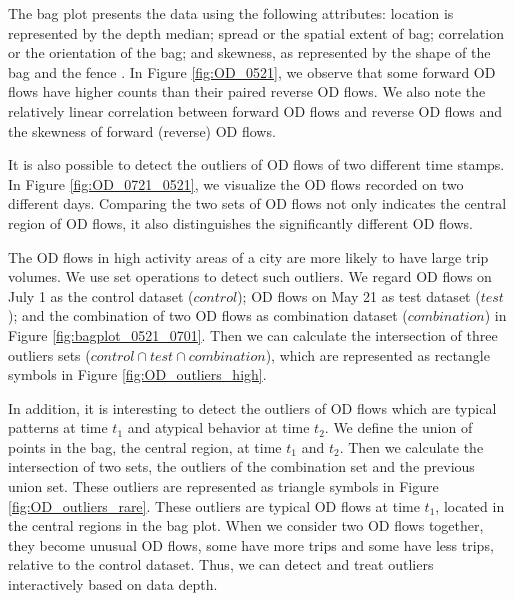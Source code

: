 \documentclass[a4paper,UKenglish]{lipics-v2018}
\begin{document}
The bag plot presents the data using the following attributes: location is represented by the depth median; spread or the spatial extent of bag; correlation or the orientation of the bag; and skewness, as represented by the shape of the bag and the fence \cite{rousseeuw99AS}.  In Figure \ref{fig:OD_0521}, we observe that some forward OD flows have higher counts than their paired reverse OD flows. We also note the relatively linear correlation between forward OD flows and reverse OD flows and the skewness of forward (reverse) OD flows. 

It is also possible to detect the outliers of OD flows of two different time stamps. In Figure \ref{fig:OD_0721_0521}, we visualize the OD flows recorded on two different days.
Comparing the two sets of OD flows not only indicates the central region of OD flows, it also distinguishes the significantly  different OD flows. 


The OD flows in high activity areas of a city are more likely to have large trip volumes. We use set operations to detect such outliers. We regard OD flows on July 1  as the control dataset ($control$); OD flows on May 21 as test dataset ($test$); and the combination of two OD flows as combination dataset ($combination$) in Figure \ref{fig:bagplot_0521_0701}. Then we can calculate the intersection of three outliers sets ($control \cap test \cap combination$), which are represented as rectangle symbols in Figure \ref{fig:OD_outliers_high}. 

In addition, it is interesting to detect the outliers of OD flows which are typical patterns at time $t_1$ and atypical behavior at time $t_2$.  We define the union of points in the bag, the central region, at time $t_1$ and $t_2$. Then we calculate the intersection of two sets, the outliers of the combination set and the previous union set. These outliers are represented as triangle symbols in Figure \ref{fig:OD_outliers_rare}. These outliers are typical OD flows at time $t_1$, located in the central regions in the bag plot. When we consider two OD flows together, they become unusual OD flows, some have more trips and some have less trips,  relative to the control dataset. Thus, we can detect and treat outliers interactively based on data depth.

\end{document}
